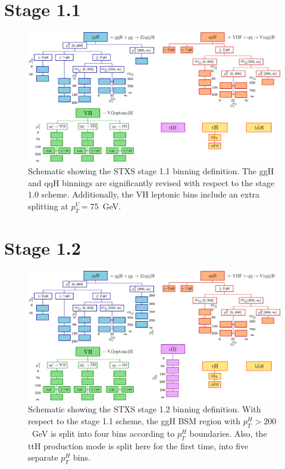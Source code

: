 \section{Stage 1.1}
\begin{figure}[htb!]
  \centering
  \includegraphics[width=.95\linewidth]{Figures/app_merging_schemes/stage1p1.pdf}
  \caption[Schematic of the STXS stage 1.1 binning scheme]
  {
    Schematic showing the STXS stage 1.1 binning definition. The ggH and qqH binnings are significantly revised with respect to the stage 1.0 scheme. Additionally, the VH leptonic bins include an extra splitting at $p_T^V=75$~GeV.
  }
  \label{fig:stxs_schematic_stage1p1}
\end{figure}
\vspace{-.5cm}
\FloatBarrier
\section{Stage 1.2}
\begin{figure}[htb!]
  \centering
  \includegraphics[width=.95\linewidth]{Figures/app_merging_schemes/stage1p2.pdf}
  \caption[Schematic of the STXS stage 1.2 binning scheme]
  {
    Schematic showing the STXS stage 1.2 binning definition. With respect to the stage 1.1 scheme, the ggH BSM region with $p_T^H>200$~GeV is split into four bins according to $p_T^H$ boundaries. Also, the ttH production mode is split here for the first time, into five separate $p_T^H$ bins.
  }
  \label{fig:stxs_schematic_stage1p2}
\end{figure}
